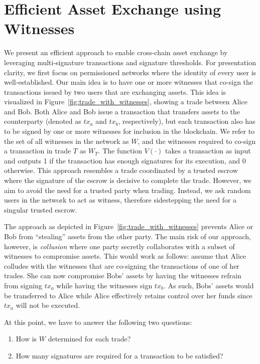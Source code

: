 \documentclass{article}
\begin{document}
\section{Efficient Asset Exchange using Witnesses}
We present an efficient approach to enable cross-chain asset exchange by leveraging multi-signature transactions and signature thresholds.
For presentation clarity, we first focus on permissioned networks where the identity of every user is well-established.
Our main idea is to have one or more witnesses that co-sign the transactions issued by two users that are exchanging assets.
This idea is visualized in Figure~\ref{fig:trade_with_witnesses}, showing a trade between Alice and Bob.
Both Alice and Bob issue a transaction that transfers assets to the counterparty (denoted as $ tx_a $ and $ tx_b $, respectively), but each transaction also has to be signed by one or more witnesses for inclusion in the blockchain.
We refer to the set of all witnesses in the network as $ W $, and the witnesses required to co-sign a transaction in trade $ T $ as $ W_T $.
The function $ V(\cdot) $ takes a transaction as input and outputs 1 if the transaction has enough signatures for its execution, and 0 otherwise.
This approach resembles a trade coordinated by a trusted escrow where the signature of the escrow is decisive to complete the trade.
However, we aim to avoid the need for a trusted party when trading.
Instead, we ask random users in the network to act as witness, therefore sidestepping the need for a singular trusted escrow.

The approach as depicted in Figure~\ref{fig:trade_with_witnesses} prevents Alice or Bob from \enquote{stealing} assets from the other party.
The main risk of our approach, however, is \emph{collusion} where one party secretly collaborates with a subset of witnesses to compromise assets.
This would work as follows: assume that Alice colludes with the witnesses that are co-signing the transactions of one of her trades.
She can now compromise Bobs' assets by having the witnesses refrain from signing $ tx_a $ while having the witnesses sign $ tx_b $.
As such, Bobs' assets would be transferred to Alice while Alice effectively retains control over her funds since $ tx_a $ will not be executed.

At this point, we have to answer the following two questions:
\begin{enumerate}
	\item How is $ W $ determined for each trade?
	\item How many signatures are required for a transaction to be satisfied?
\end{enumerate}
\end{document}
